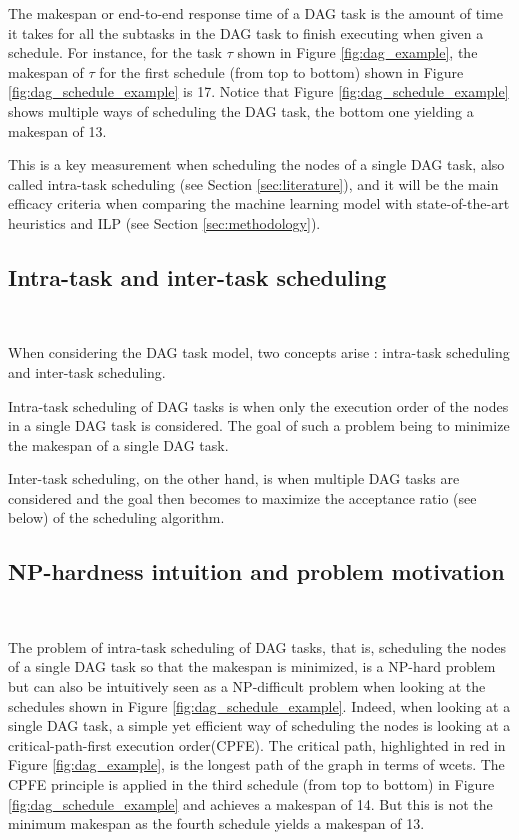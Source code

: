 The makespan or end-to-end response time of a 
DAG task is the amount of time it takes for all the subtasks
in the DAG task to finish executing when given a schedule.
For instance, for the task $\tau$ shown in Figure \ref{fig:dag_example},
the makespan of $\tau$ for the first schedule (from top to bottom) shown in Figure \ref{fig:dag_schedule_example}
is 17.
Notice that Figure \ref{fig:dag_schedule_example} shows multiple
ways of scheduling the DAG task, the bottom one yielding a makespan of 13.

This is a key measurement when scheduling the nodes of a single DAG task,
also called intra-task scheduling (see Section \ref{sec:literature}),
and it will be the main efficacy criteria when comparing 
the machine learning model with state-of-the-art heuristics and ILP
(see Section \ref{sec:methodology}).

\subsection{Intra-task and inter-task scheduling}
~

When considering the DAG task model,
two concepts arise : intra-task scheduling and inter-task scheduling.

Intra-task scheduling of DAG tasks is when only the execution
order of the nodes in a single DAG task is considered.
The goal of such a problem being to minimize the makespan
of a single DAG task.

Inter-task scheduling, on the other hand, is when multiple DAG tasks
are considered and the goal then becomes to maximize the acceptance ratio (see below)
of the scheduling algorithm.

\subsection{NP-hardness intuition and problem motivation}
~

The problem of intra-task scheduling of DAG tasks,
that is, scheduling the nodes of a single DAG task so that 
the makespan is minimized,
is a NP-hard problem\cite{ULLMAN1975NPhard}\cite{du1989schedNPhard}
but can also be intuitively seen as a NP-difficult problem when looking at 
the schedules shown in Figure \ref{fig:dag_schedule_example}.
Indeed, 
when looking at a single DAG task,
a simple yet efficient way of scheduling the nodes 
is looking at a critical-path-first execution order(CPFE).
The critical path, highlighted in red in Figure \ref{fig:dag_example},
is the longest path of the graph in terms of wcets.
The CPFE principle is applied in the third schedule (from top to bottom)
in Figure \ref{fig:dag_schedule_example} and achieves a makespan of 14.
But this is not the minimum makespan as the fourth schedule yields a makespan
of 13.

